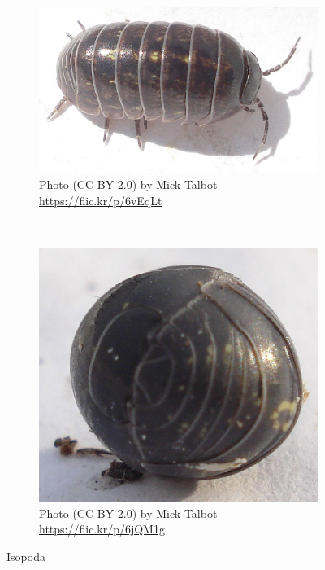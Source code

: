 \documentclass[letterpaper, 11pt]{article}
\begin{document}
\begin{figure}[ht!]
    \centering
    \begin{subfigure}[ht!]{0.55\textwidth}
        \includegraphics[width=\textwidth]{isopod}
        \caption{Photo (CC BY 2.0) by Mick Talbot \url{https://flic.kr/p/6vEqLt}}
        \label{fig:isopod1}
    \end{subfigure}
    ~ %
    \begin{subfigure}[ht!]{0.35\textwidth}
        \includegraphics[width=\textwidth]{isopod2}
        \caption{Photo (CC BY 2.0) by Mick Talbot \url{https://flic.kr/p/6jQM1g}}
        \label{fig:isopod2}
    \end{subfigure}
    \caption{Isopoda} \label{fig:isopoda}
\end{figure}
\end{document}
